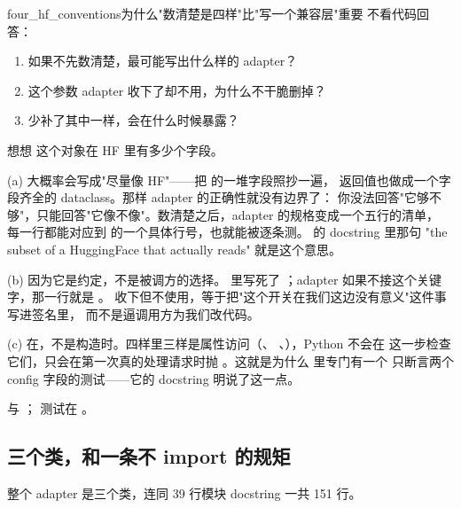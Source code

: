 \begin{checkpoint}{four_hf_conventions}{为什么"数清楚是四样"比"写一个兼容层"重要}
不看代码回答：
\begin{enumerate}[label=(\alph*)]
  \item 如果不先数清楚，最可能写出什么样的 adapter？
  \item {} 这个参数 adapter 收下了却不用，为什么不干脆删掉？
  \item 少补了其中一样，会在什么时候暴露？
\end{enumerate}
\hint 想想  这个对象在 HF 里有多少个字段。

\ifshowanswers
\tcblower
\answer (a) 大概率会写成"尽量像 HF"——把  的一堆字段照抄一遍，
返回值也做成一个字段齐全的 dataclass。那样 adapter 的正确性就没有边界了：
你没法回答"它够不够"，只能回答"它像不像"。数清楚之后，adapter 的规格变成一个五行的清单，
每一行都能对应到  的一个具体行号，也就能被逐条测。
 的 docstring 里那句 "the subset of a HuggingFace 
that  actually reads" 就是这个意思。

(b) 因为它是约定，不是被调方的选择。 里写死了
；adapter 如果不接这个关键字，那一行就是 。
收下但不使用，等于把"这个开关在我们这边没有意义"这件事写进签名里，
而不是逼调用方为我们改代码。

(c) 在，不是构造时。四样里三样是属性访问（、
、），Python 不会在
 这一步检查它们，只会在第一次真的处理请求时抛
。这就是为什么  里专门有一个
只断言两个 config 字段的测试——它的 docstring 明说了这一点。

\whereincode {} 与 ；
测试在 。
\fi
\end{checkpoint}

\subsection{三个类，和一条不 import 的规矩}
\label{sec:b-kv-adapter}

整个 adapter 是三个类，连同 39 行模块 docstring 一共 151 行。

